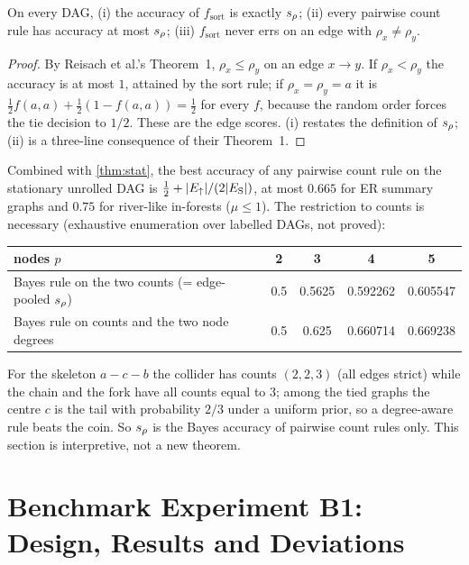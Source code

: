 \begin{proposition}[elementary]\label{prop:x3}
On every DAG, (i) the accuracy of $f_{\mathrm{sort}}$ is exactly $s_\rho$;
(ii) every pairwise count rule has accuracy at most $s_\rho$; (iii)
$f_{\mathrm{sort}}$ never errs on an edge with $\rho_x\ne\rho_y$.
\end{proposition}
\begin{proof}
By Reisach et al.'s Theorem~1, $\rho_x\le\rho_y$ on an edge $x\to y$. If
$\rho_x<\rho_y$ the accuracy is at most $1$, attained by the sort rule; if
$\rho_x=\rho_y=a$ it is $\tfrac12f(a,a)+\tfrac12(1-f(a,a))=\tfrac12$ for every
$f$, because the random order forces the tie decision to $1/2$. These are the edge
scores. (i) restates the definition of $s_\rho$; (ii) is a three-line consequence of
their Theorem~1.
\end{proof}
Combined with \cref{thm:stat}, the best accuracy of any pairwise count rule on the
stationary unrolled DAG is $\tfrac12+|E_{\uparrow}|/(2|E_{\mathrm S}|)$, at most $0.665$ for ER
summary graphs and $0.75$ for river-like in-forests ($\mu\le1$). The restriction
to counts is necessary (exhaustive enumeration over labelled DAGs, not proved):

\begin{center}\small
\begin{tabular}{lcccc}
\toprule
nodes $p$ & 2 & 3 & 4 & 5 \\
\midrule
Bayes rule on the two counts (= edge-pooled $s_\rho$) & 0.5 & 0.5625 & 0.592262 & 0.605547 \\
Bayes rule on counts and the two node degrees & 0.5 & 0.625 & 0.660714 & 0.669238 \\
\bottomrule
\end{tabular}
\end{center}
For the skeleton $a-c-b$ the collider has counts $(2,2,3)$ (all edges strict)
while the chain and the fork have all counts equal to $3$; among the tied graphs the
centre $c$ is the tail with probability $2/3$ under a uniform prior, so a
degree-aware rule beats the coin. So $s_\rho$ is the Bayes accuracy of pairwise
count rules only. This section is interpretive, not a new theorem.

\section{Benchmark Experiment B1: Design, Results and Deviations}
\label{app:b1}


